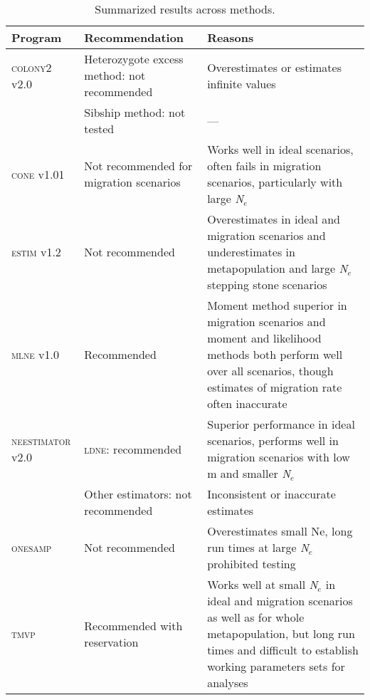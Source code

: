 \begin{table}[]
\centering \footnotesize
\begin{tabular}{p{}|p{}|p{}}
\small{Program}			& \small{Recommendation}		        & \small{Reasons} \\ \hline
\textsc{colony2} v2.0 	&	Heterozygote excess method: not recommended	& Overestimates or estimates infinite values \\
						& 	Sibship method: not tested	        & --- \\ \hline
\textsc{cone} v1.01 	&	Not recommended for migration scenarios	& Works well in ideal scenarios, often fails in migration scenarios, particularly with large \emph{N}$_e$ \\ \hline
\textsc{estim} v1.2 	&	Not recommended	                    & Overestimates in ideal and migration scenarios and underestimates in metapopulation and large \emph{N}$_e$ stepping stone scenarios \\ \hline
\textsc{mlne} v1.0 		&	Recommended	                        & Moment method superior in migration scenarios and moment and likelihood methods both perform well over all scenarios, though estimates of migration rate often inaccurate \\ \hline
\textsc{neestimator} v2.0 	&	\textsc{ldne}: recommended      & Superior performance in ideal scenarios, performs well in migration scenarios with low m and smaller \emph{N}$_e$ \\
						& 	Other estimators: not recommended	& Inconsistent or inaccurate estimates \\ \hline
\textsc{onesamp} 		&	Not recommended	                    & Overestimates small Ne, long run times at large \emph{N}$_e$ prohibited testing \\ \hline 
\textsc{tmvp}			&	Recommended with reservation	    & Works well at small \emph{N}$_e$ in ideal and migration scenarios as well as for whole metapopulation, but long run times and difficult to establish working parameters sets for analyses \\
\end{tabular}
\label{tab:ne-4}
\caption{Summarized results across methods.}
\end{table}

